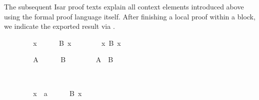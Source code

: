 \begin{isabellebody}
\begin{isamarkuptext}
  \medskip The subsequent Isar proof texts explain all context
  elements introduced above using the formal proof language itself.
  After finishing a local proof within a block, we indicate the
  exported result via \hyperlink{command.note}{\mbox{}}.%
\end{isamarkuptext}%
\isamarkuptrue%
%
\isadelimproof
%
\endisadelimproof
%
\isatagproof
%
\begin{minipage}[t]{0.4\textwidth}
\ \ \isacommand{{\isacharbraceleft}}\isamarkupfalse%
\isanewline
\ \ \ \ \isamarkupfalse%
\ x\isanewline
\ \ \ \ \isamarkupfalse%
\ {\isachardoublequoteopen}B\ x{\isachardoublequoteclose}%
\endisatagproof
{\isafoldproof}%
%
\isadelimproof
%
\endisadelimproof
%
\isadelimnoproof
\ %
\endisadelimnoproof
%
\isatagnoproof
{}\isamarkupfalse%
%
\endisatagnoproof
{\isafoldnoproof}%
%
\isadelimnoproof
\isanewline
%
\endisadelimnoproof
%
\isadelimproof
\ \ %
\endisadelimproof
%
\isatagproof
\isacommand{{\isacharbraceright}}\isamarkupfalse%
\isanewline
\ \ \isamarkupfalse%
\ {\isacharbackquoteopen}{\isasymAnd}x{\isachardot}\ B\ x{\isacharbackquoteclose}%
\end{minipage}\quad\begin{minipage}[t]{0.4\textwidth}
\ \ \isacommand{{\isacharbraceleft}}\isamarkupfalse%
\isanewline
\ \ \ \ \isamarkupfalse%
\ A\isanewline
\ \ \ \ \isamarkupfalse%
\ B%
\endisatagproof
{\isafoldproof}%
%
\isadelimproof
%
\endisadelimproof
%
\isadelimnoproof
\ %
\endisadelimnoproof
%
\isatagnoproof
{}\isamarkupfalse%
%
\endisatagnoproof
{\isafoldnoproof}%
%
\isadelimnoproof
\isanewline
%
\endisadelimnoproof
%
\isadelimproof
\ \ %
\endisadelimproof
%
\isatagproof
\isacommand{{\isacharbraceright}}\isamarkupfalse%
\isanewline
\ \ \isamarkupfalse%
\ {\isacharbackquoteopen}A\ {\isasymLongrightarrow}\ B{\isacharbackquoteclose}%
\end{minipage}\\[3ex]\begin{minipage}[t]{0.4\textwidth}
\ \ \isacommand{{\isacharbraceleft}}\isamarkupfalse%
\isanewline
\ \ \ \ \isamarkupfalse%
\ x\ {\isasymequiv}\ a\isanewline
\ \ \ \ \isamarkupfalse%
\ {\isachardoublequoteopen}B\ x{\isachardoublequoteclose}%
\endisatagproof
{\isafoldproof}%
%
\isadelimproof
%
\endisadelimproof
%
\isadelimnoproof
\ %
\endisadelimnoproof
%
\isatagnoproof
{}\isamarkupfalse%
%
\endisatagnoproof

\end{minipage}
\end{isabellebody}
